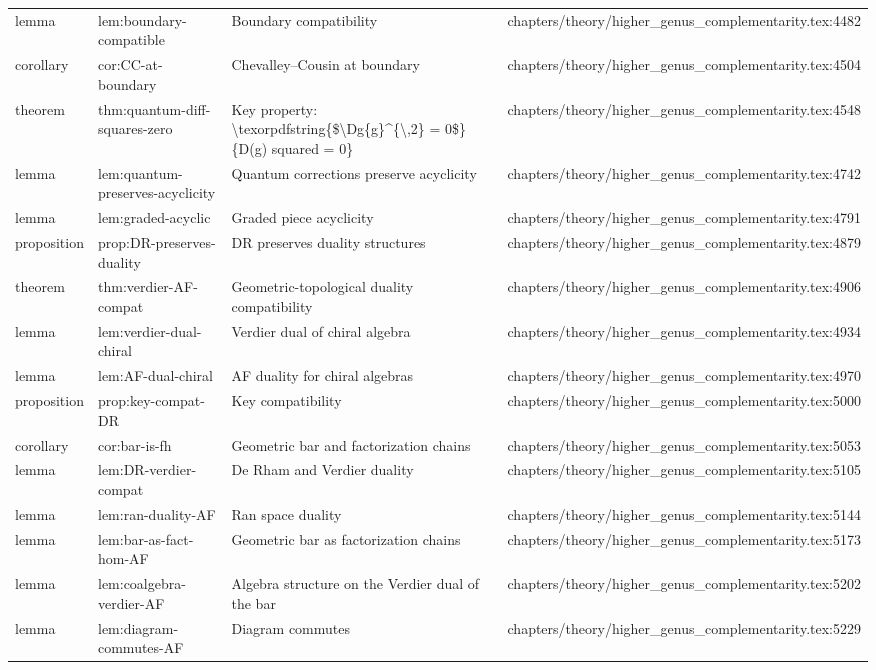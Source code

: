 \documentclass[11pt]{article}
\begin{document}
\begin{longtable}{L{0.10\textwidth}L{0.26\textwidth}L{0.42\textwidth}L{0.22\textwidth}}
lemma & lem:boundary-compatible & Boundary compatibility & chapters/theory/higher\_genus\_complementarity.tex:4482\\
corollary & cor:CC-at-boundary & Chevalley--Cousin at boundary & chapters/theory/higher\_genus\_complementarity.tex:4504\\
theorem & thm:quantum-diff-squares-zero & Key property: \textbackslash{}texorpdfstring\{\$\textbackslash{}Dg\{g\}\textasciicircum{}\{\textbackslash{},2\} = 0\$\}\{D(g) squared = 0\} & chapters/theory/higher\_genus\_complementarity.tex:4548\\
lemma & lem:quantum-preserves-acyclicity & Quantum corrections preserve acyclicity & chapters/theory/higher\_genus\_complementarity.tex:4742\\
lemma & lem:graded-acyclic & Graded piece acyclicity & chapters/theory/higher\_genus\_complementarity.tex:4791\\
proposition & prop:DR-preserves-duality & DR preserves duality structures & chapters/theory/higher\_genus\_complementarity.tex:4879\\
theorem & thm:verdier-AF-compat & Geometric-topological duality compatibility & chapters/theory/higher\_genus\_complementarity.tex:4906\\
lemma & lem:verdier-dual-chiral & Verdier dual of chiral algebra & chapters/theory/higher\_genus\_complementarity.tex:4934\\
lemma & lem:AF-dual-chiral & AF duality for chiral algebras & chapters/theory/higher\_genus\_complementarity.tex:4970\\
proposition & prop:key-compat-DR & Key compatibility & chapters/theory/higher\_genus\_complementarity.tex:5000\\
corollary & cor:bar-is-fh & Geometric bar and factorization chains & chapters/theory/higher\_genus\_complementarity.tex:5053\\
lemma & lem:DR-verdier-compat & De Rham and Verdier duality & chapters/theory/higher\_genus\_complementarity.tex:5105\\
lemma & lem:ran-duality-AF & Ran space duality & chapters/theory/higher\_genus\_complementarity.tex:5144\\
lemma & lem:bar-as-fact-hom-AF & Geometric bar as factorization chains & chapters/theory/higher\_genus\_complementarity.tex:5173\\
lemma & lem:coalgebra-verdier-AF & Algebra structure on the Verdier dual of the bar & chapters/theory/higher\_genus\_complementarity.tex:5202\\
lemma & lem:diagram-commutes-AF & Diagram commutes & chapters/theory/higher\_genus\_complementarity.tex:5229\\

\end{longtable}
\end{document}
